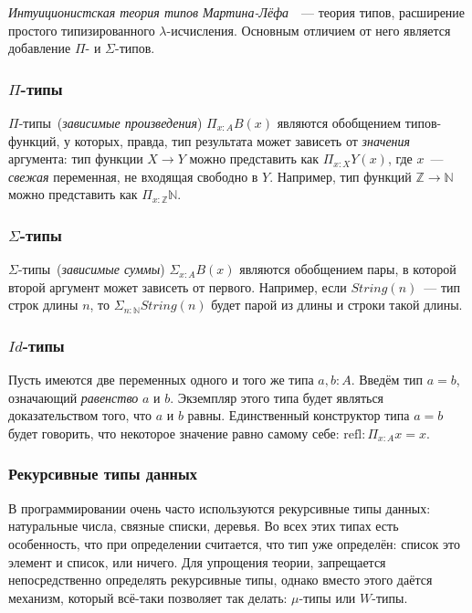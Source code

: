\emph{Интуиционистская теория типов Мартина-Лёфа}~\cite{mltt}~---
теория типов, расширение простого типизированного
$\lambda$-исчисления. Основным отличием от него является добавление
$\Pi$- и $\Sigma$-типов.

\subsubsection{$\Pi$-типы}

$\Pi$-типы~(\emph{зависимые произведения}) $\Pi_{x:A} B(x)$ являются
обобщением типов-функций, у которых, правда, тип результата может
зависеть от \emph{значения} аргумента: тип функции $X \to Y$ можно
представить как $\Pi_{x:X} Y(x)$, где $x$~--- \emph{свежая}
переменная, не входящая свободно в $Y$. Например, тип функций
$\mathbb{Z} \to \mathbb{N}$ можно представить как $\Pi_{x:\mathbb{Z}}
\mathbb{N}$.

\subsubsection{$\Sigma$-типы}

$\Sigma$-типы~(\emph{зависимые суммы}) $\Sigma_{x:A} B(x)$ являются
обобщением пары, в которой второй аргумент может зависеть от первого.
Например, если $String(n)$~--- тип строк длины $n$, то
$\Sigma_{n:\mathbb{N}} String(n)$ будет парой из длины и строки такой
длины.

\subsubsection{$Id$-типы}

Пусть имеются две переменных одного и того же типа $a, b : A$. Введём
тип $a = b$, означающий \emph{равенство} $a$ и $b$. Экземпляр этого
типа будет являться доказательством того, что $a$ и $b$ равны.
Единственный конструктор типа $a = b$ будет говорить, что некоторое
значение равно самому себе: $\mathrm{refl} : \Pi_{x:A} x = x$.

\subsubsection{Рекурсивные типы данных}

В программировании очень часто используются рекурсивные типы данных:
натуральные числа, связные списки, деревья. Во всех этих типах есть
особенность, что при определении считается, что тип уже определён:
список это элемент и список, или ничего. Для упрощения теории,
запрещается непосредственно определять рекурсивные типы, однако вместо
этого даётся механизм, который всё-таки позволяет так делать:
$\mu$-типы или $W$-типы.

